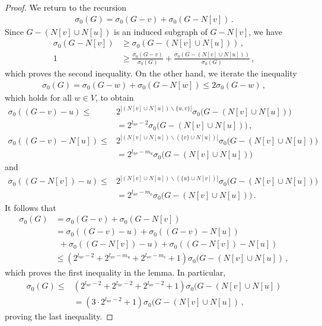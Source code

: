\documentclass[a4paper,12pt]{amsart}
\theoremstyle{remark}
\begin{document}
\begin{proof}
We return to the recursion
\begin{align*}
\sigma_0(G)=\sigma_0(G-v)+\sigma_0(G-N[v])\,.
\end{align*}
Since $G-(N[v]\cup N[u])$ is an induced subgraph of $G-N[v]$, we have 
\begin{align*}
\sigma_0(G-N[v]) &\geq \sigma_0(G-(N[v]\cup N[u])) \,,\\
1&\geq \frac{\sigma_0(G-v)}{\sigma_0(G)}+\frac{\sigma_0(G-(N[v]\cup N[u]))}{\sigma_0(G)}\,,
\end{align*}
which proves the second inequality. On the other hand, we iterate the inequality
\begin{align*}
\sigma_0(G)=\sigma_0(G-w)+\sigma_0(G-N[w])\leq 2\sigma_0(G-w)\,,
\end{align*}
which holds for all $w\in V$, to obtain
\begin{align*}
\sigma_0((G-v)-u)\leq &2^{|(N[v]\cup N[u])\backslash \{u,v\}|} \sigma_0\big(G-(N[v]\cup N[u]) \big)\\
 &=2^{l_{uv}-2} \sigma_0\big(G-(N[v]\cup N[u]) \big)\,,\\
\sigma_0((G-v)-N[u])\leq & 2^{|(N[v]\cup N[u]) \backslash (\{v\} \cup N[u])|} \sigma_0 \big(G-(N[v]\cup N[u]) \big)\\
&= 2^{l_{uv}-m_u} \sigma_0 \big(G-(N[v]\cup N[u]) \big)
\end{align*}
and
\begin{align*}
\sigma_0((G-N[v])-u)\leq & 2^{|(N[v]\cup N[u]) \backslash (\{u\} \cup N[v])|} \sigma_0 \big(G-(N[v]\cup N[u]) \big)\\
 &= 2^{l_{uv}-m_v} \sigma_0 \big(G-(N[v]\cup N[u]) \big)\,.
\end{align*}
It follows that
\begin{align*}
\sigma_0(G)&=\sigma_0(G-v)+\sigma_0(G-N[v])\\
&= \sigma_0((G-v)-u)+\sigma_0((G-v)-N[u])\\
& ~ ~ + \sigma_0((G-N[v])-u)+\sigma_0((G-N[v])-N[u])\\
&\leq (2^{l_{uv}-2}+2^{l_{uv}-m_u} +2^{l_{uv}-m_v}+1)\sigma_0(G-(N[v]\cup N[u])\,,
\end{align*}
which proves the first inequality in the lemma. In particular, 
\begin{align*}
\sigma_0(G)\leq & (2^{l_{uv}-2}+2^{l_{uv}-2} +2^{l_{uv}-2}+1)\sigma_0(G-(N[v]\cup N[u])\\
&=(3\cdot 2^{l_{uv}-2}+1)\sigma_0(G-(N[v]\cup N[u])\,,
\end{align*}
proving the last inequality.

\end{proof}
\end{document}
